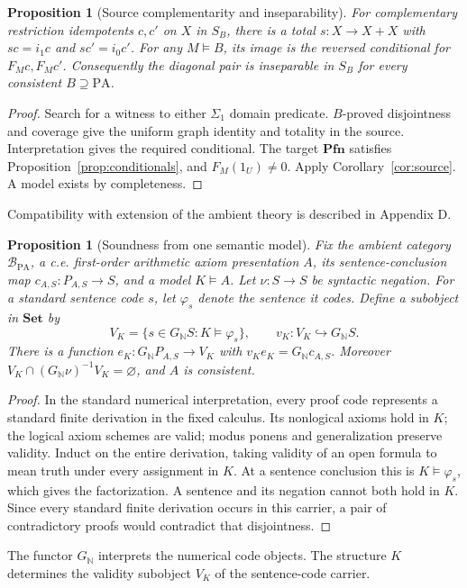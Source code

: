 \documentclass[11pt]{article}
\newtheorem{proposition}[theorem]{Proposition}
\theoremstyle{definition}\newtheorem{definition}[theorem]{Definition}
\newcommand{\PA}{\mathrm{PA}}
\newcommand{\N}{\mathbb N}
\newcommand{\Set}{\mathbf{Set}}
\newcommand{\Pfn}{\mathbf{Pfn}}
\newcommand{\B}{\mathcal B}
\begin{document}
\begin{proposition}[Source complementarity and inseparability]\label{prop:st-pair}
For complementary restriction idempotents $c,c'$ on $X$ in $S_B$,
there is a total $s:X\to X+X$ with $sc=i_1c$ and $sc'=i_0c'$.
For any $M\models B$, its image is the reversed conditional for
$F_Mc,F_Mc'$. Consequently the diagonal pair is inseparable in
$S_B$ for every consistent $B\supseteq\PA$.
\end{proposition}
\begin{proof}
Search for a witness to either $\Sigma_1$ domain predicate.
$B$-proved disjointness and coverage give the uniform graph identity
and totality in the source. Interpretation gives the required
conditional. The target $\Pfn$ satisfies
Proposition~\ref{prop:conditionals}, and $F_M(1_U)\ne0$.
Apply Corollary~\ref{cor:source}. A model exists by completeness.
\end{proof}
Compatibility with extension of the ambient theory is described
in Appendix D.

\begin{proposition}[Soundness from one semantic model]\label{prop:soundness}
Fix the ambient category $\B_{\PA}$, a c.e. first-order arithmetic
axiom presentation $A$, its sentence-conclusion map
$c_{A,S}:P_{A,S}\to S$, and a model $K\models A$.
Let $\nu:S\to S$ be syntactic negation. For a standard sentence
code $s$, let $\varphi_s$ denote the sentence it codes.
Define a subobject in $\Set$ by
\[
 V_K=\{s\in G_{\N}S:K\models\varphi_s\},\qquad
 v_K:V_K\hookrightarrow G_{\N}S.
\]
There is a function $e_K:G_{\N}P_{A,S}\to V_K$ with
$v_Ke_K=G_{\N}c_{A,S}$. Moreover
$V_K\cap(G_{\N}\nu)^{-1}V_K=\varnothing$, and $A$ is consistent.
\end{proposition}
\begin{proof}
In the standard numerical interpretation, every proof code represents
a standard finite derivation in the fixed calculus. Its nonlogical
axioms hold in $K$; the logical axiom schemes are valid; modus ponens
and generalization preserve validity. Induct on the entire derivation,
taking validity of an open formula to mean truth under every
assignment in $K$. At a sentence conclusion this is
$K\models\varphi_s$, which gives the factorization.
A sentence and its negation cannot both
hold in $K$. Since every standard finite derivation occurs in this carrier, a
pair of contradictory proofs would contradict that disjointness.
\end{proof}
The functor $G_{\N}$ interprets the numerical code objects.
The structure $K$ determines the validity subobject $V_K$ of
the sentence-code carrier.
\end{document}
